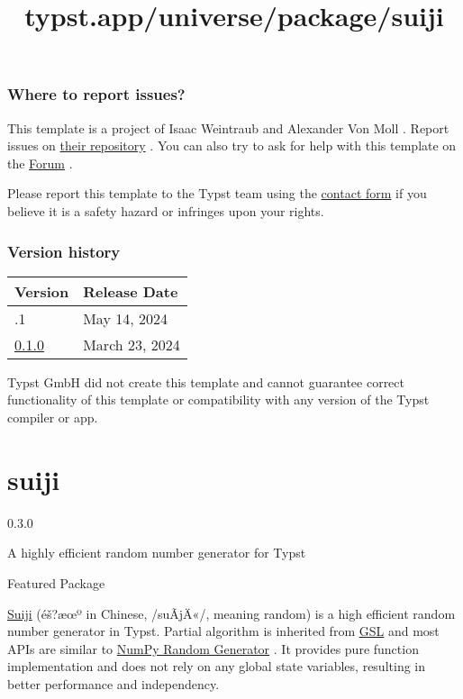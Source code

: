 \subsubsection{Where to report issues?}\label{where-to-report-issues}

This template is a project of Isaac Weintraub and Alexander Von Moll .
Report issues on \href{https://github.com/isaacew/aiaa-typst}{their
repository} . You can also try to ask for help with this template on the
\href{https://forum.typst.app}{Forum} .

Please report this template to the Typst team using the
\href{https://typst.app/contact}{contact form} if you believe it is a
safety hazard or infringes upon your rights.

\label{versions}
\subsubsection{Version history}\label{version-history}

\begin{longtable}[]{@{}ll@{}}
\toprule\noalign{}
Version & Release Date \\
\midrule\noalign{}
\endhead
\bottomrule\noalign{}
\endlastfoot
0.1.1 & May 14, 2024 \\
\href{https://typst.app/universe/package/bamdone-aiaa/0.1.0/}{0.1.0} &
March 23, 2024 \\
\end{longtable}

Typst GmbH did not create this template and cannot guarantee correct
functionality of this template or compatibility with any version of the
Typst compiler or app.


\title{typst.app/universe/package/suiji}

\label{banner}
\section{suiji}\label{suiji}

{ 0.3.0 }

A highly efficient random number generator for Typst

{ } Featured Package

\label{readme}
\href{https://github.com/liuguangxi/suiji}{Suiji} (éš?æœº in Chinese,
/suÃ­jÄ«/, meaning random) is a high efficient random number generator in
Typst. Partial algorithm is inherited from
\href{https://www.gnu.org/software/gsl}{GSL} and most APIs are similar
to
\href{https://numpy.org/doc/stable/reference/random/generator.html}{NumPy
Random Generator} . It provides pure function implementation and does
not rely on any global state variables, resulting in better performance
and independency.


